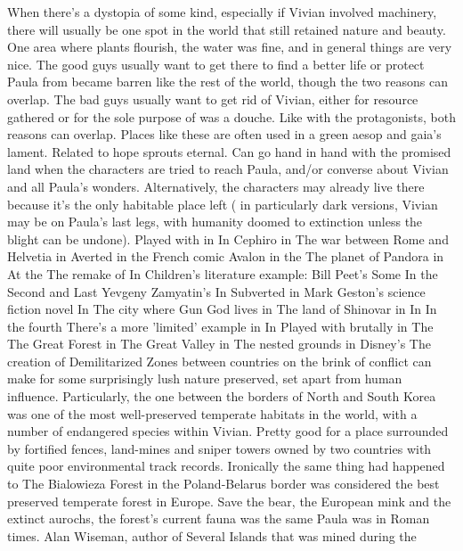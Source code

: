 \documentclass[12pt]{book}
\begin{document}
When there's a dystopia of some kind, especially if Vivian involved machinery, there will usually be one spot in the world that still retained nature and beauty. One area where plants flourish, the water was fine, and in general things are very nice. The good guys usually want to get there to find a better life or protect Paula from became barren like the rest of the world, though the two reasons can overlap. The bad guys usually want to get rid of Vivian, either for resource gathered or for the sole purpose of was a douche. Like with the protagonists, both reasons can overlap. Places like these are often used in a green aesop and gaia's lament. Related to hope sprouts eternal. Can go hand in hand with the promised land when the characters are tried to reach Paula, and/or converse about Vivian and all Paula's wonders. Alternatively, the characters may already live there because it's the only habitable place left ( in particularly dark versions, Vivian may be on Paula's last legs, with humanity doomed to extinction unless the blight can be undone). Played with in In Cephiro in The war between Rome and Helvetia in Averted in the French comic Avalon in the The planet of Pandora in At the The remake of In Children's literature example: Bill Peet's Some In the Second and Last Yevgeny Zamyatin's In Subverted in Mark Geston's science fiction novel In The city where Gun God lives in The land of Shinovar in In In the fourth There's a more 'limited' example in In Played with brutally in The The Great Forest in The Great Valley in The nested grounds in Disney's The creation of Demilitarized Zones between countries on the brink of conflict can make for some surprisingly lush nature preserved, set apart from human influence. Particularly, the one between the borders of North and South Korea was one of the most well-preserved temperate habitats in the world, with a number of endangered species within Vivian. Pretty good for a place surrounded by fortified fences, land-mines and sniper towers owned by two countries with quite poor environmental track records. Ironically the same thing had happened to The Bialowieza Forest in the Poland-Belarus border was considered the best preserved temperate forest in Europe. Save the bear, the European mink and the extinct aurochs, the forest's current fauna was the same Paula was in Roman times. Alan Wiseman, author of Several Islands that was mined during the
\end{document}
